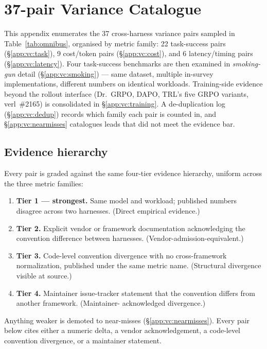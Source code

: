 \documentclass{article}
\begin{document}

\section{37-pair Variance Catalogue}
\label{app:variance-catalogue}

This appendix enumerates the 37 cross-harness variance pairs
sampled in Table~\ref{tab:omnibus}, organised by metric family:
22 task-success pairs (\S\ref{app:vc:task}), 9 cost/token
pairs (\S\ref{app:vc:cost}), and 6 latency/timing pairs
(\S\ref{app:vc:latency}). Four task-success benchmarks are
then examined in \emph{smoking-gun} detail
(\S\ref{app:vc:smoking}) --- same dataset, multiple in-survey
implementations, different numbers on identical workloads.
Training-side evidence beyond the rollout interface
(Dr.\ GRPO, DAPO, TRL's five GRPO variants, verl~\#2165) is
consolidated in \S\ref{app:vc:training}. A de-duplication log
(\S\ref{app:vc:dedup}) records which family each pair is
counted in, and \S\ref{app:vc:nearmisses} catalogues leads that
did not meet the evidence bar.

\subsection{Evidence hierarchy}
\label{app:vc:hierarchy}

Every pair is graded against the same four-tier evidence
hierarchy, uniform across the three metric families:

\begin{enumerate}
\item \textbf{Tier 1 --- strongest.} Same model and workload;
published numbers disagree across two harnesses. (Direct
empirical evidence.)
\item \textbf{Tier 2.} Explicit vendor or framework
documentation acknowledging the convention difference between
harnesses. (Vendor-admission-equivalent.)
\item \textbf{Tier 3.} Code-level convention divergence with
no cross-framework normalization, published under the same
metric name. (Structural divergence visible at source.)
\item \textbf{Tier 4.} Maintainer issue-tracker statement that
the convention differs from another framework. (Maintainer-%
acknowledged divergence.)
\end{enumerate}
Anything weaker is demoted to near-misses
(\S\ref{app:vc:nearmisses}). Every pair below cites either a
numeric delta, a vendor acknowledgement, a code-level
convention divergence, or a maintainer statement.
\end{document}
